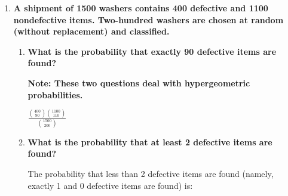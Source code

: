 \documentclass[10pt, oneside]{article}
\begin{document}
\begin{enumerate}[label=2.\arabic*]
\begin{enumerate}
	Proceeding with the analogous logic as in the previous two problems:
	
	\begin{align*}
	P\Bigg( \bigcup^n_{k=1} A_k \Bigg) &= \sum^n_{k=1} (-1)^{k-1} \binom{n}{k} \frac{(n-k)!}{n!} \\
	&= \boxed{ \sum^n_{k=1} (-1)^{k-1} \frac{1}{k!} }
	\end{align*}

	\item \begin{tcolorbox}[
  colback=Cerulean!5!white,
  colframe=Cerulean!75!black]
   \textbf{Discuss the answer to (c) if $\bm{n}$ is large.}
	\end{tcolorbox}
	
	Now, recall the fact that
	
	\[ e^{-1} = \sum^\infty_{k = 0} \frac{(-1)^k}{k!} \]
	
	From this we can deduce that the limit of the previous solution as $n \rightarrow \infty$ is $\boxed{1 - e^{-1}}$.
	\end{enumerate}
\item \begin{tcolorbox}[
  colback=Cerulean!5!white,
  colframe=Cerulean!75!black]
  \textbf{A shipment of 1500 washers contains 400 defective and 1100 nondefective items. Two-hundred washers are chosen at random (without replacement) and classified.}
  \end{tcolorbox}
  
  	\begin{enumerate}
	\item  \begin{tcolorbox}[
  colback=Cerulean!5!white,
  colframe=Cerulean!75!black]
  	\textbf{What is the probability that exactly 90 defective items are found?}
  	 \end{tcolorbox}
	 
	 \textbf{Note: These two questions deal with hypergeometric probabilities.}
	 
	 $\boxed{\frac{\binom{400}{90} \binom{1100}{110}}{\binom{1500}{200}}}$
	 \item  \begin{tcolorbox}[
  colback=Cerulean!5!white,
  colframe=Cerulean!75!black]
  	\textbf{What is the probability that at least 2 defective items are found?}
  	 \end{tcolorbox}
	 
	 The probability that less than 2 defective items are found (namely, exactly 1 and 0 defective items are found) is:
	 

\end{enumerate}
\end{enumerate}
\end{document}
